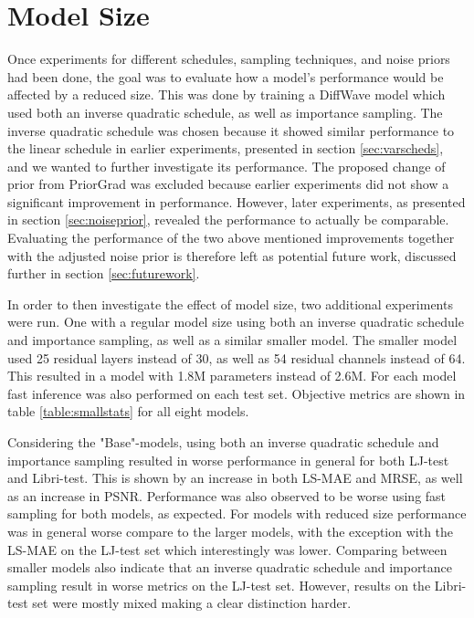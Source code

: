 \documentclass{report}
\begin{document}
\section{Model Size} \label{sec:modelsize}


Once experiments for different schedules, sampling techniques, and noise priors had been done, the goal was to evaluate how a model's performance would be affected by a reduced size. This was done by training a DiffWave model which used both an inverse quadratic schedule, as well as importance sampling. The inverse quadratic schedule was chosen because it showed similar performance to the linear schedule in earlier experiments, presented in section \ref{sec:varscheds}, and we wanted to further investigate its performance. The proposed change of prior from PriorGrad was excluded because earlier experiments did not show a significant improvement in performance. However, later experiments, as presented in section \ref{sec:noiseprior}, revealed the performance to actually be comparable. Evaluating the performance of the two above mentioned improvements together with the adjusted noise prior is therefore left as potential future work, discussed further in section \ref{sec:futurework}.

In order to then investigate the effect of model size, two additional experiments were run. One with a regular model size using both an inverse quadratic schedule and importance sampling, as well as a similar smaller model. The smaller model used 25 residual layers instead of 30, as well as 54 residual channels instead of 64. This resulted in a model with 1.8M parameters instead of 2.6M. For each model fast inference was also performed on each test set. Objective metrics are shown in table \ref{table:smallstats} for all eight models. 

Considering the "Base"-models, using both an inverse quadratic schedule and importance sampling resulted in worse performance in general for both LJ-test and Libri-test. This is shown by an increase in both LS-MAE and MRSE, as well as an increase in PSNR. Performance was also observed to be worse using fast sampling for both models, as expected. For models with reduced size performance was in general worse compare to the larger models, with the exception with the LS-MAE on the LJ-test set which interestingly was lower. Comparing between smaller models also indicate that an inverse quadratic schedule and importance sampling result in worse metrics on the LJ-test set. However, results on the Libri-test set were mostly mixed making a clear distinction harder.
\end{document}
